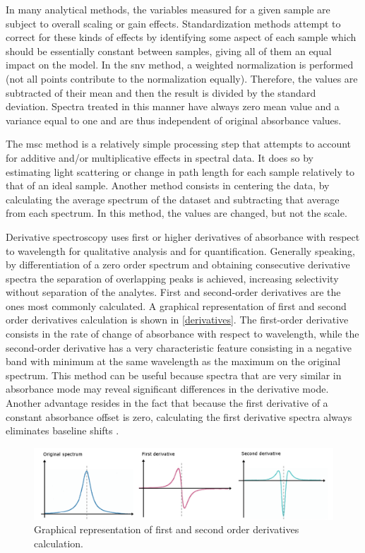 In many analytical methods, the variables measured for a given sample are subject to overall scaling or gain effects. Standardization methods attempt to correct for these kinds of effects by identifying some aspect of each sample which should be essentially constant between samples, giving all of them an equal impact on the model. In the \acrfull{snv} method, a weighted normalization is performed (not all points contribute to the normalization equally). Therefore, the values are subtracted of their mean and then the result is divided by the standard deviation. Spectra treated in this manner have always zero mean value and a variance equal to one and are thus independent of original absorbance values. 

The \acrfull{msc} method is a relatively simple processing step that attempts to account for additive and/or multiplicative effects in spectral data. It does so by estimating light scattering or change in path length for each sample relatively to that of an ideal sample. Another method consists in centering the data, by calculating the average spectrum of the dataset and subtracting that average from each spectrum. In this method, the values are changed, but not the scale.

Derivative spectroscopy uses first or higher derivatives of absorbance with respect to wavelength for qualitative analysis and for quantification. Generally speaking, by differentiation of a zero order spectrum and obtaining consecutive derivative spectra the separation of overlapping peaks is achieved, increasing selectivity without separation of the analytes. First and second-order derivatives are the ones most commonly calculated. A graphical representation of first and second order derivatives calculation is shown in \autoref{derivatives}. The first-order derivative consists in the rate of change of absorbance with respect to wavelength, while the second-order derivative has a very characteristic feature consisting in a negative band with minimum at the same wavelength as the maximum on the original spectrum. This method can be useful because spectra that are very similar in absorbance mode may reveal significant differences in the derivative mode. Another advantage resides in the fact that because the first derivative of a constant absorbance offset is zero, calculating the first derivative spectra always eliminates baseline shifts \citep{kus1996derivative}.

\begin{figure}[!htb]
	\centering
	\includegraphics[width=1\linewidth]{Imagens/derivatives}
	\caption{Graphical representation of first and second order derivatives calculation.}
	\label{derivatives}
\end{figure}


